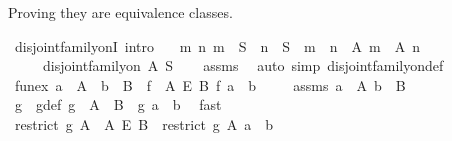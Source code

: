 \begin{isabellebody}
%
\begin{isamarkuptext}%
Proving they are equivalence classes.%
\end{isamarkuptext}\isamarkuptrue%
\isamarkupfalse%
\ disjoint{\isacharunderscore}{\kern0pt}family{\isacharunderscore}{\kern0pt}onI\ {\isacharbrackleft}{\kern0pt}intro{\isacharbrackright}{\kern0pt}{\isacharcolon}{\kern0pt}\isanewline
\ \ \ {\isachardoublequoteopen}{\isasymAnd}m\ n{\isachardot}{\kern0pt}\ m\ {\isasymin}\ S\ {\isasymLongrightarrow}\ n\ {\isasymin}\ S\ {\isasymLongrightarrow}\ m\ {\isasymnoteq}\ n\ {\isasymLongrightarrow}\ A\ m\ {\isasyminter}\ A\ n\ {\isacharequal}{\kern0pt}\ {\isacharbraceleft}{\kern0pt}{\isacharbraceright}{\kern0pt}{\isachardoublequoteclose}\isanewline
\ \ \ \ \ {\isachardoublequoteopen}disjoint{\isacharunderscore}{\kern0pt}family{\isacharunderscore}{\kern0pt}on\ A\ S{\isachardoublequoteclose}\isanewline
%
\isadelimproof
\ \ %
\endisadelimproof
%
\isatagproof
{}\isamarkupfalse%
\ assms\ \isamarkupfalse%
\ {\isacharparenleft}{\kern0pt}auto\ simp{\isacharcolon}{\kern0pt}\ disjoint{\isacharunderscore}{\kern0pt}family{\isacharunderscore}{\kern0pt}on{\isacharunderscore}{\kern0pt}def{\isacharparenright}{\kern0pt}%
\endisatagproof
{\isafoldproof}%
%
\isadelimproof
\isanewline
%
\endisadelimproof
\isanewline
{}\isamarkupfalse%
\ fun{\isacharunderscore}{\kern0pt}ex{\isacharcolon}{\kern0pt}\ {\isachardoublequoteopen}a\ {\isasymin}\ A\ {\isasymLongrightarrow}\ b\ {\isasymin}\ B\ {\isasymLongrightarrow}\ {\isasymexists}f\ {\isasymin}\ A\ {\isasymrightarrow}\isactrlsub E\ B{\isachardot}{\kern0pt}\ f\ a\ {\isacharequal}{\kern0pt}\ b{\isachardoublequoteclose}\ \isanewline
%
\isadelimproof
%
\endisadelimproof
%
\isatagproof
{}\isamarkupfalse%
{\isacharminus}{\kern0pt}\isanewline
\ \ \isamarkupfalse%
\ assms{\isacharcolon}{\kern0pt}\ {\isachardoublequoteopen}a\ {\isasymin}\ A{\isachardoublequoteclose}\ {\isachardoublequoteopen}b\ {\isasymin}\ B{\isachardoublequoteclose}\isanewline
\ \ \isamarkupfalse%
\ \isamarkupfalse%
\ g\ \ g{\isacharunderscore}{\kern0pt}def{\isacharcolon}{\kern0pt}\ {\isachardoublequoteopen}g\ {\isasymin}\ A\ {\isasymrightarrow}\ B\ {\isasymand}\ g\ a\ {\isacharequal}{\kern0pt}\ b{\isachardoublequoteclose}\ \isamarkupfalse%
\ fast\isanewline
\ \ \isamarkupfalse%
\ \isamarkupfalse%
\ {\isachardoublequoteopen}restrict\ g\ A\ {\isasymin}\ A\ {\isasymrightarrow}\isactrlsub E\ B\ {\isasymand}\ {\isacharparenleft}{\kern0pt}restrict\ g\ A{\isacharparenright}{\kern0pt}\ a\ {\isacharequal}{\kern0pt}\ b{\isachardoublequoteclose}\ \isamarkupfalse%

\end{isabellebody}
